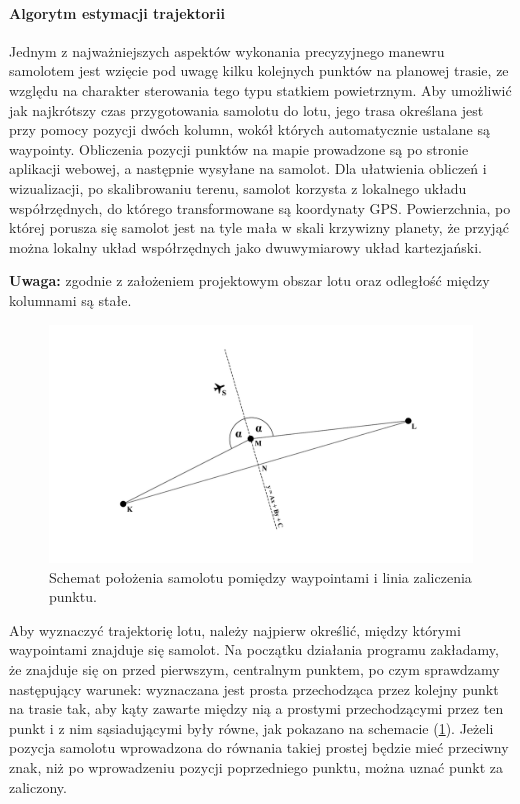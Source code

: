 \documentclass[12pt, a4paper]{article}
\let\oldref\ref
\renewcommand{\ref}[1]{(\oldref{#1})}
\begin{document}
\FloatBarrier
\paragraph{Algorytm estymacji trajektorii}\mbox{}

Jednym z najważniejszych aspektów wykonania precyzyjnego manewru samolotem jest wzięcie pod uwagę kilku kolejnych punktów na planowej trasie, ze względu na charakter sterowania tego typu statkiem powietrznym. Aby umożliwić jak najkrótszy czas przygotowania samolotu do lotu, jego trasa określana jest przy pomocy pozycji dwóch kolumn, wokół których automatycznie ustalane są waypointy. Obliczenia pozycji punktów na mapie prowadzone są po stronie aplikacji webowej, a następnie wysyłane na samolot. Dla ułatwienia obliczeń i wizualizacji, po skalibrowaniu terenu, samolot korzysta z lokalnego układu współrzędnych, do którego transformowane są koordynaty GPS. Powierzchnia, po której porusza się samolot jest na tyle mała w skali krzywizny planety, że przyjąć można lokalny układ współrzędnych jako dwuwymiarowy układ kartezjański. 

\textbf{Uwaga:} zgodnie z założeniem projektowym obszar lotu oraz odległość między kolumnami są stałe.

 \begin{figure}[ht]
    \centering
    \includegraphics[width=1\textwidth]{nextwaypoint}
    \caption{Schemat położenia samolotu pomiędzy waypointami i linia zaliczenia punktu.}
    \label{fig:wp}
\end{figure}

Aby wyznaczyć trajektorię lotu, należy najpierw określić, między którymi waypointami znajduje się samolot. Na początku działania programu zakładamy, że znajduje się on przed pierwszym, centralnym punktem, po czym sprawdzamy następujący warunek: wyznaczana jest prosta przechodząca przez kolejny punkt na trasie tak, aby kąty zawarte między nią a prostymi przechodzącymi przez ten punkt i z nim sąsiadującymi były równe, jak pokazano na schemacie \ref{fig:wp}. Jeżeli pozycja samolotu wprowadzona do równania takiej prostej będzie mieć przeciwny znak, niż po wprowadzeniu pozycji poprzedniego punktu, można uznać punkt za zaliczony. 
\end{document}
